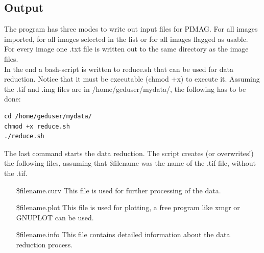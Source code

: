 \subsection{Output}
The program has three modes to write out input files for PIMAG. For all images imported, for all images selected in the list or for all images flagged as usable. \\
For every image one .txt file is written out to the same directory as the image files. \\
In the end a bash-script is written to reduce.sh that can be used for data reduction. Notice that it must be executable (chmod +x) to execute it. Assuming the .tif and .img files are in /home/geduser/mydata/, the following has to be done: \\

\begin{lstlisting}
cd /home/geduser/mydata/
chmod +x reduce.sh
./reduce.sh 
\end{lstlisting}

The last command starts the data reduction. The script creates (or overwrites!) the following files, assuming that \$filename was the name of the .tif file, without the .tif.  

\begin{itemize}
\item [\$filename.curv] This file is used for further processing of the data. 
\item [\$filename.plot] This file is used for plotting, a free program like xmgr \cite{xmgr} or GNUPLOT \cite{gnuplot} can be used. 
\item [\$filename.info] This file contains detailed information about the data reduction process.
\end{itemize}




